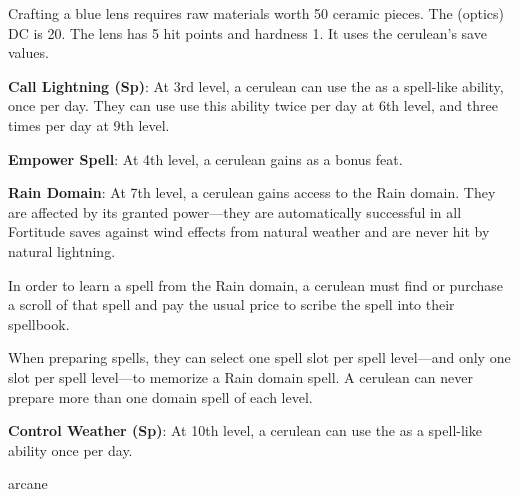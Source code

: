 {Crafting a blue lens requires raw materials worth 50 ceramic pieces. The  (optics) DC is 20. The lens has 5 hit points and hardness 1. It uses the cerulean's save values.

\textbf{Call Lightning (Sp)}: At 3rd level, a cerulean can use the  as a spell-like ability, once per day. They can use use this ability twice per day at 6th level, and three times per day at 9th level.

\textbf{Empower Spell}: At 4th level, a cerulean gains  as a bonus feat.

\textbf{Rain Domain}: At 7th level, a cerulean gains access to the Rain domain. They are affected by its granted power---they are automatically successful in all Fortitude saves against wind effects from natural weather and are never hit by natural lightning.

In order to learn a spell from the Rain domain, a cerulean must find or purchase a scroll of that spell and pay the usual price to scribe the spell into their spellbook. 

When preparing spells, they can select one spell slot per spell level---and only one slot per spell level---to memorize a Rain domain spell. A cerulean can never prepare more than one domain spell of each level.

\textbf{Control Weather (Sp)}: At 10th level, a cerulean can use the  as a spell-like ability once per day.
}
{}
{arcane}
{}
{}
{}